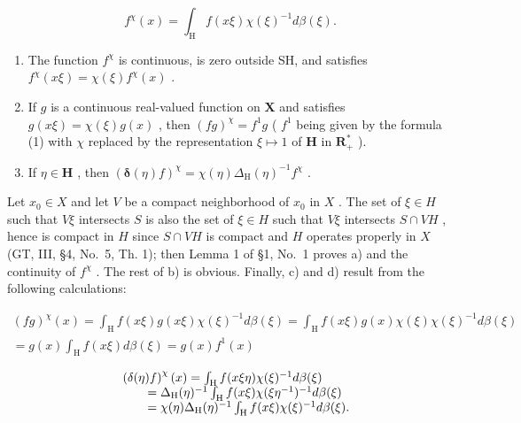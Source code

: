 \[
f ^ {\chi} (x) = \int_ {\mathrm{H}} f (x \xi) \chi (\xi) ^ {- 1} d \beta (\xi).\tag{1}
\]

\begin{enumerate}
\def\labelenumi{\alph{enumi})}
\setcounter{enumi}{1}
\item
  The function \(f^{\chi}\) is continuous, is zero outside SH, and satisfies \(f^{\chi}(x\xi) = \chi(\xi)f^{\chi}(x)\) .
\item
  If \(g\) is a continuous real-valued function on \(\mathbf{X}\) and satisfies \(g(x\xi) = \chi(\xi)g(x)\) , then \((fg)^{\chi} = f^{1}g\) ( \(f^{1}\) being given by the formula (1) with \(\chi\) replaced by the representation \(\xi \mapsto 1\) of \(\mathbf{H}\) in \(\mathbf{R}_{+}^{*}\) ).
\item
  If \(\eta \in \mathbf{H}\) , then \(\left(\pmb{\delta}(\eta)f\right)^{\chi} = \chi (\eta)\Delta_{\mathrm{H}}(\eta)^{-1}f^{\chi}\) .
\end{enumerate}

Let \(x_0 \in X\) and let \(V\) be a compact neighborhood of \(x_0\) in \(X\) . The set of \(\xi \in H\) such that \(V\xi\) intersects \(S\) is also the set of \(\xi \in H\) such that \(V\xi\) intersects \(S \cap VH\) , hence is compact in \(H\) since \(S \cap VH\) is compact and \(H\) operates properly in \(X\) (GT, III, §4, No.~5, Th. 1); then Lemma 1 of §1, No.~1 proves a) and the continuity of \(f^{\chi}\) . The rest of b) is obvious. Finally, c) and d) result from the following calculations:

\[
\begin{array}{c} (f g) ^ {\chi} (x) = \int_ {\mathrm{H}} f (x \xi) g (x \xi) \chi (\xi) ^ {- 1} d \beta (\xi) = \int_ {\mathrm{H}} f (x \xi) g (x) \chi (\xi) \chi (\xi) ^ {- 1} d \beta (\xi) \\ = g (x) \int_ {\mathrm{H}} f (x \xi) d \beta (\xi) = g (x) f ^ {1} (x) \end{array}
\]

\[
\begin{array}{r l} & {\left(\delta (\eta) f\right) ^ {\chi} (x) = \int_ {\mathrm{H}} f (x \xi \eta) \chi (\xi) ^ {- 1} d \beta (\xi)} \\ & {\qquad = \Delta_ {\mathrm{H}} (\eta) ^ {- 1} \int_ {\mathrm{H}} f (x \xi) \chi (\xi \eta^ {- 1}) ^ {- 1} d \beta (\xi)} \\ & {\qquad = \chi (\eta) \Delta_ {\mathrm{H}} (\eta) ^ {- 1} \int_ {\mathrm{H}} f (x \xi) \chi (\xi) ^ {- 1} d \beta (\xi).} \end{array}
\]

